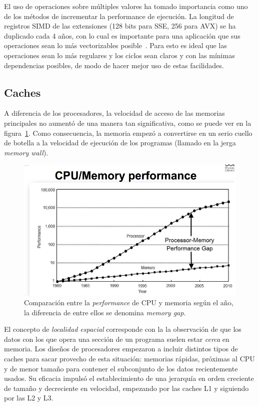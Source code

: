 El uso de operaciones sobre m\'ultiples valores ha tomado importancia como uno de los m\'etodos de incrementar la performance de ejecuci\'on.
La longitud de registros SIMD de las extensiones (128 bits para SSE, 256 para AVX) se ha duplicado cada 4 a\~nos, con lo cual es importante para una aplicaci\'on que sus operaciones sean lo m\'as vectorizables posible~\cite{HennessyPatterson}.
Para esto es ideal que las operaciones sean lo m\'as regulares y los ciclos sean claros y con las m\'inimas dependencias posibles, de modo de hacer mejor uso de estas facilidades.

\subsection{Caches}

A diferencia de los procesadores, la velocidad de acceso de las memorias principales no aument\'o de una manera tan significativa, como se puede ver en la figura~\ref{fig:cpu_vs_mem}. Como consecuencia, la memoria empez\'o a convertirse en un serio cuello de botella a la velocidad de ejecuci\'on de los programas (llamado en la jerga \textit{memory wall}).

\begin{figure}[htbp]
    \centering
    \includegraphics[width=\plotwidth]{images/cpu_vs_memory.png}
    \caption{Comparaci\'on entre la \textit{performance} de CPU y memoria seg\'un el a\~no, la diferencia de entre ellos se denomina \textit{memory gap}.}
    \label{fig:cpu_vs_mem}

\end{figure}

El concepto de \textit{localidad espacial} corresponde con la la observaci\'on de que los datos con los que opera una secci\'on de un programa suelen estar \emph{cerca} en memoria.
Los dise\~nos de procesadores empezaron a incluir distintos tipos de caches para sacar provecho de esta situaci\'on: memorias r\'apidas, pr\'oximas al CPU y de menor tama\~no para contener el subconjunto de los datos recientemente usados.
Su eficacia impuls\'o el establecimiento de una jerarqu\'ia en orden creciente de tama\~no y decreciente en velocidad, empezando por las caches L1 y siguiendo por las L2 y L3.

